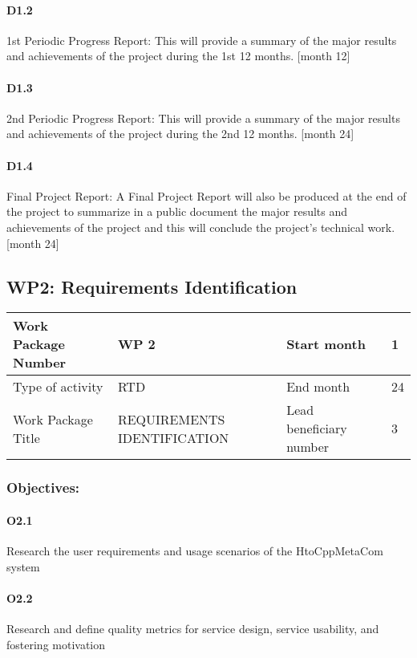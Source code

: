 \documentclass{article}
\begin{document}
\paragraph{D1.2} 1st Periodic Progress Report: This will provide a summary of the major results and achievements of the project during the 1st 12 months. [month 12]
\paragraph{D1.3} 2nd Periodic Progress Report: This will provide a summary of the major results and achievements of the project during the 2nd 12 months. [month 24]
\paragraph{D1.4} Final Project Report: A Final Project Report will also be produced at the end of the project to summarize in a public document the major results and achievements of the project and this will conclude the project's technical work. [month 24]

\newpage
\subsection{WP2: Requirements Identification}

\begin{center}
	\begin{tabular}{ |p{3cm}|p{4cm}||p{2cm}|p{1cm}| }
		\hline
		Work Package Number & WP 2 & Start month & 1  \\ \hline
		Type of activity & RTD & End month & 24 \\ \hline
		Work Package Title & REQUIREMENTS IDENTIFICATION & Lead beneficiary number & 3 \\ \hline
	\end{tabular}
\end{center}

\subsubsection{Objectives:}
\paragraph{O2.1} Research the user requirements and usage scenarios of the HtoCppMetaCom system
\paragraph{O2.2}  Research and define quality metrics for service design, service usability, and fostering motivation
\end{document}
